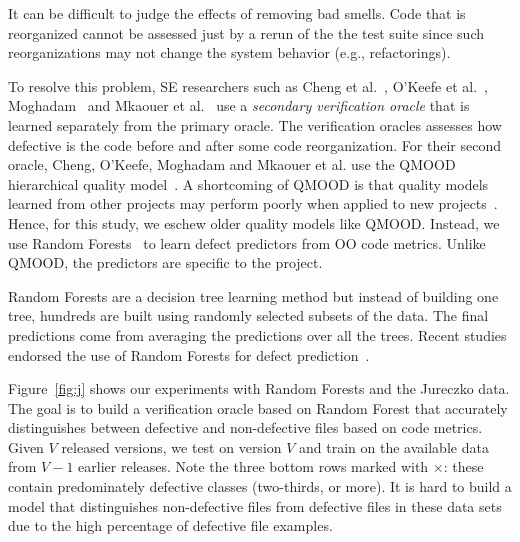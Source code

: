 \documentclass[twocolumn,5p]{elsarticle}
\newcommand{\fig}[1]{Figure~\ref{fig:#1}}
\theoremstyle{break}
\begin{document}
\begin{itemize}
		It can be difficult  to judge the  effects of removing bad smells.
		Code that is reorganized cannot be assessed just by a rerun of the the test
		suite since such reorganizations may not change the system behavior (e.g., refactorings). 
		
		To resolve this  problem, SE researchers such as 
		Cheng et al.~\cite{Cheng10}, O'Keefe et al.~\cite{OKeeffe08,OKeeffe07},
		Moghadam~\cite{Moghadam2011} and Mkaouer et al.~\cite{Mkaouer14}
		use a {\em secondary verification oracle} that is learned separately
		from the primary oracle. The verification oracles assesses
		how defective is the code before and after some
		code reorganization. 
		For their second oracle,
		Cheng, O'Keefe, Moghadam and  Mkaouer et al. use the QMOOD hierarchical
		quality model~\cite{Bansiya02}.
		A shortcoming of QMOOD
		is that quality models learned from other projects
		may perform poorly when applied to new projects~\cite{localvsglobal}.
		Hence, for this study, we  eschew
		older quality models like QMOOD. Instead, we use
		Random Forests~\cite{Breiman2001} to learn defect predictors
		from OO code metrics.
		Unlike QMOOD, the predictors 
		are specific to the project.
		
		Random Forests are a decision tree learning method but
		instead of building one tree, hundreds are built using
		randomly selected subsets of the data. The final predictions
		come from averaging the predictions over all the trees.
		Recent studies endorsed the use
		of  Random Forests for  defect prediction~\cite{lessmann}.
		
		\fig{j} shows  our experiments with Random Forests and
		the Jureczko data. The goal is to build a verification oracle based on Random Forest that accurately distinguishes between defective and non-defective files based on code metrics. Given $V$ released versions, we test on version $V$ and train on the available data from $V-1$ earlier releases. Note the   \colorbox{lavenderpink}{three bottom rows}   marked with $\times$: these contain predominately defective classes (two-thirds, or more).  It is hard to build a model that distinguishes non-defective files from defective files in these data sets due to the high percentage of defective file examples. 
		

\end{itemize}
\end{document}

